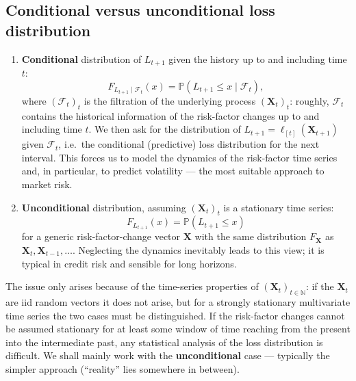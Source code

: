 \documentclass[11pt,a4paper]{article}
\renewcommand{\P}{\mathbb{P}}
\begin{document}
\subsection{Conditional versus unconditional loss distribution}
\begin{enumerate}[label=\arabic*)]
  \item \textbf{Conditional} distribution of $L_{t+1}$ given the history up to and including time $t$:
        \[
          F_{L_{t+1}\mid\mathcal{F}_t}(x)=\P(L_{t+1}\le x\mid\mathcal{F}_t),
        \]
        where $(\mathcal{F}_t)_t$ is the filtration of the underlying process
        $(\mathbf{X}_t)_t$: roughly, $\mathcal{F}_t$ contains the historical information of the
        risk-factor changes up to and including time $t$. We then ask for the distribution of
        $L_{t+1}=\ell_{[t]}(\mathbf{X}_{t+1})$ given $\mathcal{F}_t$, i.e.\ the conditional
        (predictive) loss distribution for the next interval. This forces us to model the dynamics
        of the risk-factor time series and, in particular, to predict volatility --- the most
        suitable approach to market risk.
  \item \textbf{Unconditional} distribution, assuming $(\mathbf{X}_t)_t$ is a stationary time
        series:
        \[
          F_{L_{t+1}}(x)=\P(L_{t+1}\le x)
        \]
        for a generic risk-factor-change vector $\mathbf{X}$ with the same distribution
        $F_{\mathbf{X}}$ as $\mathbf{X}_t,\mathbf{X}_{t-1},\dots$. Neglecting the dynamics
        inevitably leads to this view; it is typical in credit risk and sensible for long horizons.
\end{enumerate}
The issue only arises because of the time-series properties of $(\mathbf{X}_t)_{t\in\mathbb N}$: if
the $\mathbf{X}_t$ are iid random vectors it does not arise, but for a strongly stationary
multivariate time series the two cases must be distinguished. If the risk-factor changes cannot be
assumed stationary for at least some window of time reaching from the present into the intermediate
past, any statistical analysis of the loss distribution is difficult. We shall mainly work with the
\textbf{unconditional} case --- typically the simpler approach (``reality'' lies somewhere in
between).
\end{document}
